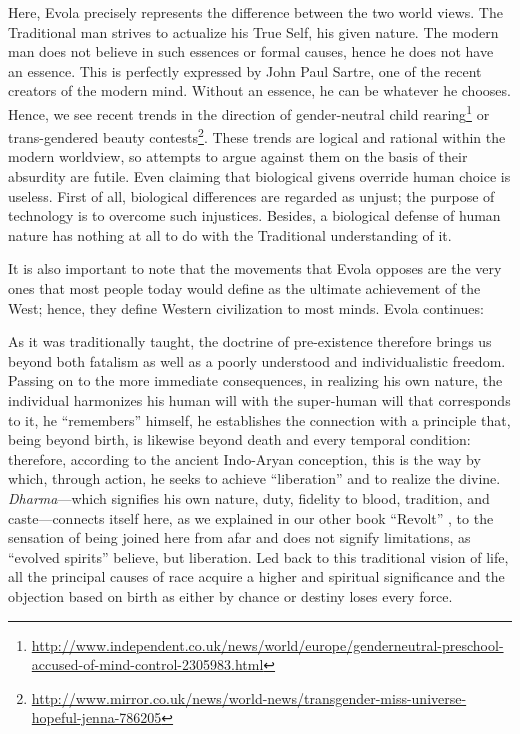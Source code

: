 Here, Evola precisely represents the difference between the two world views. The Traditional man strives to actualize his True Self, his given nature. The modern man does not believe in such essences or formal causes, hence he does not have an essence. This is perfectly expressed by John Paul Sartre, one of the recent creators of the modern mind. Without an essence, he can be whatever he chooses. Hence, we see recent trends in the direction of gender-neutral child rearing\footnote{\url{http://www.independent.co.uk/news/world/europe/genderneutral-preschool-accused-of-mind-control-2305983.html}} or trans-gendered beauty contests\footnote{\url{http://www.mirror.co.uk/news/world-news/transgender-miss-universe-hopeful-jenna-786205}}. These trends are logical and rational within the modern worldview, so attempts to argue against them on the basis of their absurdity are futile. Even claiming that biological givens override human choice is useless. First of all, biological differences are regarded as unjust; the purpose of technology is to overcome such injustices. Besides, a biological defense of human nature has nothing at all to do with the Traditional understanding of it.

It is also important to note that the movements that Evola opposes are the very ones that most people today would define as the ultimate achievement of the West; hence, they define Western civilization to most minds. Evola continues:

\begin{quotex}
As it was traditionally taught, the doctrine of pre-existence therefore brings us beyond both fatalism as well as a poorly understood and individualistic freedom. Passing on to the more immediate consequences, in realizing his own nature, the individual harmonizes his human will with the super-human will that corresponds to it, he ``remembers'' himself, he establishes the connection with a principle that, being beyond birth, is likewise beyond death and every temporal condition: therefore, according to the ancient Indo-Aryan conception, this is the way by which, through action, he seeks to achieve ``liberation'' and to realize the divine. \emph{Dharma}---which signifies his own nature, duty, fidelity to blood, tradition, and caste---connects itself here, as we explained in our other book ``Revolt'' , to the sensation of being joined here from afar and does not signify limitations, as ``evolved spirits'' believe, but liberation. Led back to this traditional vision of life, all the principal causes of race acquire a higher and spiritual significance and the objection based on birth as either by chance or destiny loses every force.
\end{quotex}


